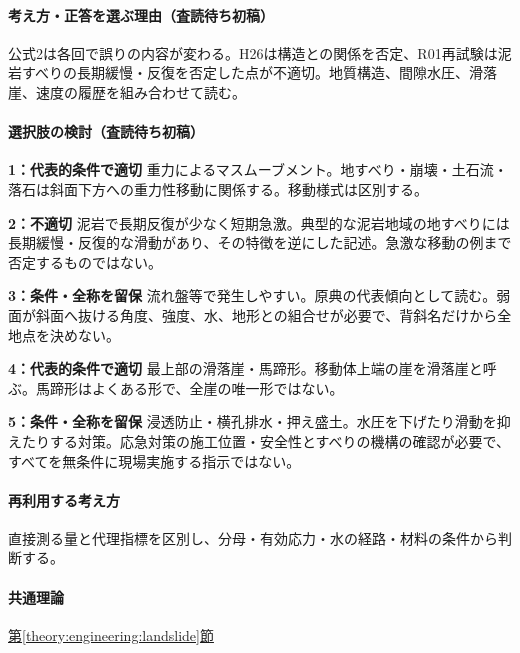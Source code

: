 \paragraph{考え方・正答を選ぶ理由（査読待ち初稿）} 公式2は各回で誤りの内容が変わる。H26は構造との関係を否定、R01再試験は泥岩すべりの長期緩慢・反復を否定した点が不適切。地質構造、間隙水圧、滑落崖、速度の履歴を組み合わせて読む。

\paragraph{選択肢の検討（査読待ち初稿）}\mbox{}\par

\noindent\textbf{1：代表的条件で適切} 重力によるマスムーブメント。地すべり・崩壊・土石流・落石は斜面下方への重力性移動に関係する。移動様式は区別する。\par

\noindent\textbf{2：不適切} 泥岩で長期反復が少なく短期急激。典型的な泥岩地域の地すべりには長期緩慢・反復的な滑動があり、その特徴を逆にした記述。急激な移動の例まで否定するものではない。\par

\noindent\textbf{3：条件・全称を留保} 流れ盤等で発生しやすい。原典の代表傾向として読む。弱面が斜面へ抜ける角度、強度、水、地形との組合せが必要で、背斜名だけから全地点を決めない。\par

\noindent\textbf{4：代表的条件で適切} 最上部の滑落崖・馬蹄形。移動体上端の崖を滑落崖と呼ぶ。馬蹄形はよくある形で、全崖の唯一形ではない。\par

\noindent\textbf{5：条件・全称を留保} 浸透防止・横孔排水・押え盛土。水圧を下げたり滑動を抑えたりする対策。応急対策の施工位置・安全性とすべりの機構の確認が必要で、すべてを無条件に現場実施する指示ではない。\par

\paragraph{再利用する考え方} 直接測る量と代理指標を区別し、分母・有効応力・水の経路・材料の条件から判断する。

\paragraph{共通理論} \hyperref[theory:engineering:landslide]{第\ref*{theory:engineering:landslide}節}

